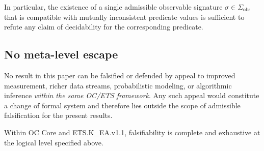 In particular, the existence of a single admissible observable
signature $\sigma \in \Sigma_{\mathrm{obs}}$ that is compatible with
mutually inconsistent predicate values is sufficient to refute any
claim of decidability for the corresponding predicate.

\subsection{No meta-level escape}
\label{subsec:no-meta-escape}

No result in this paper can be falsified or defended by appeal to
improved measurement, richer data streams, probabilistic modeling, or
algorithmic inference \emph{within the same OC/ETS framework}. Any such
appeal would constitute a change of formal system and therefore lies
outside the scope of admissible falsification for the present results.

Within OC Core and ETS.K\_EA.v1.1, falsifiability is complete and
exhaustive at the logical level specified above.
